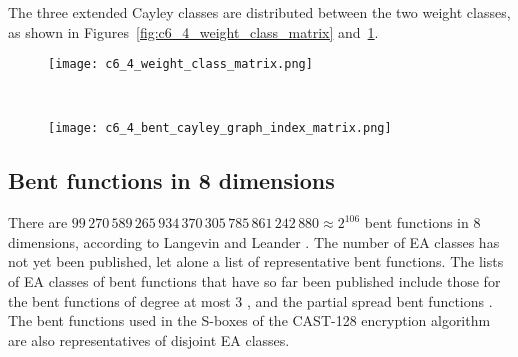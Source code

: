 
The three extended Cayley classes are distributed between the two weight classes,
as shown in Figures~\ref{fig:c6_4_weight_class_matrix} and~\ref{fig:c6_4_bent_cayley_graph_index_matrix}.

\begin{figure}[!hpt] %
\centering
\begin{minipage}{.48\textwidth}
  \centering
  \texttt{[image: c6\_4\_weight\_class\_matrix.png]}
  \label{fig:c6_4_weight_class_matrix}
\end{minipage}%
~~~~
\begin{minipage}{.48\textwidth}
  \centering
  \texttt{[image: c6\_4\_bent\_cayley\_graph\_index\_matrix.png]}
  \label{fig:c6_4_bent_cayley_graph_index_matrix}
\end{minipage}
\end{figure}
\newpage
\subsection{Bent functions in 8 dimensions}

There are
$99\,270\,589\,265\,934\,370\,305\,785\,861\,242\,880 \approx 2^{106}$ bent functions in 8 dimensions,
according to Langevin and Leander \cite{LanL11counting}.
%
%
The number of EA classes has not yet been published,
let alone a list of representative bent functions.
The lists of EA classes of bent functions that have so far been published include those
for the bent functions of degree at most 3 \cite[Section 5.5.2]{Bra06thesis} \cite[Section 7.3]{Tok15bent},
and the partial spread bent functions \cite{Lan10psf,LanH11counting}.
The bent functions used in the S-boxes of the CAST-128 encryption algorithm \cite{Ada97,RFC2144}
are also representatives of disjoint EA classes.
